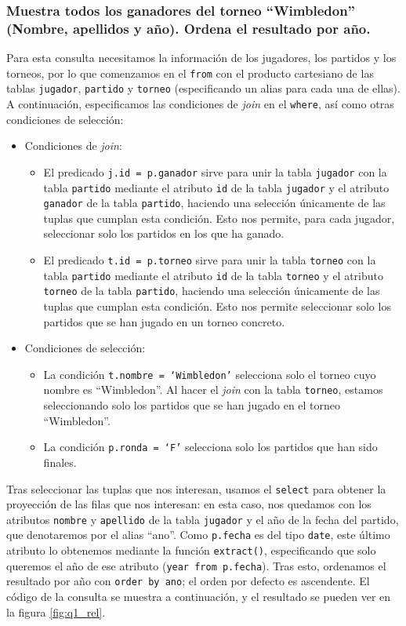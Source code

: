 \subsubsection{Muestra todos los ganadores del torneo ``Wimbledon'' (Nombre, apellidos y año). Ordena el resultado por año.}

Para esta consulta necesitamos la información de los jugadores, los partidos y los torneos, por lo que comenzamos en el \texttt{from} con el producto cartesiano de las tablas \texttt{jugador}, \texttt{partido} y \texttt{torneo} (especificando un alias para cada una de ellas). A continuación, especificamos las condiciones de \textit{join} en el \texttt{where}, así como otras condiciones de selección: 
\begin{itemize}
\item Condiciones de \textit{join}:
\begin{itemize}
\item El predicado \texttt{j.id = p.ganador} sirve para unir la tabla \texttt{jugador} con la tabla \texttt{partido} mediante el atributo \texttt{id} de la tabla \texttt{jugador} y el atributo \texttt{ganador} de la tabla \texttt{partido}, haciendo una selección únicamente de las tuplas que cumplan esta condición. Esto nos permite, para cada jugador, seleccionar solo los partidos en los que ha ganado.
\item El predicado \texttt{t.id = p.torneo} sirve para unir la tabla \texttt{torneo} con la tabla \texttt{partido} mediante el atributo \texttt{id} de la tabla \texttt{torneo} y el atributo \texttt{torneo} de la tabla \texttt{partido}, haciendo una selección únicamente de las tuplas que cumplan esta condición. Esto nos permite seleccionar solo los partidos que se han jugado en un torneo concreto.
\end{itemize}
\item Condiciones de selección:
\begin{itemize}
\item La condición \texttt{t.nombre = `Wimbledon'} selecciona solo el torneo cuyo nombre es ``Wimbledon''. Al hacer el \textit{join} con la tabla \texttt{torneo}, estamos seleccionando solo los partidos que se han jugado en el torneo ``Wimbledon''.
\item La condición \texttt{p.ronda = `F'} selecciona solo los partidos que han sido finales.
\end{itemize}
\end{itemize}

Tras seleccionar las tuplas que nos interesan, usamos el \texttt{select} para obtener la proyección de las filas que nos interesan: en esta caso, nos quedamos con los atributos \texttt{nombre} y \texttt{apellido} de la tabla \texttt{jugador} y el año de la fecha del partido, que denotaremos por el alias ``ano''. Como \texttt{p.fecha} es del tipo \texttt{date}, este último atributo lo obtenemos mediante la función \texttt{extract()}, especificando que solo queremos el año de ese atributo (\texttt{year from p.fecha}). Tras esto, ordenamos el resultado por año con \texttt{order by ano}; el orden por defecto es ascendente. El código de la consulta se muestra a continuación, y el resultado se pueden ver en la figura \ref{fig:q1_rel}.


